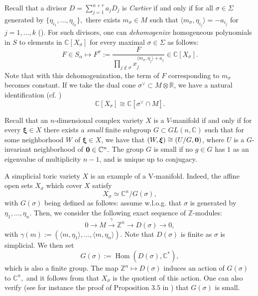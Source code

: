\documentclass[a4paper,11pt]{amsart}
\newcommand{\Hom}{\operatorname{Hom}}
\newcommand{\C}{\mathbb{C}}
\newcommand{\R}{\mathbb{R}}
\newcommand{\Z}{\mathbb{Z}}
\newcommand{\bfxi}{{\boldsymbol{\xi}}}
\numberwithin{thm}{section}
\numberwithin{equation}{section}
\theoremstyle{definition}
\theoremstyle{plain}
\begin{document}
Recall that a divisor $D=\sum_{j=1}^{n+r} a_j D_j$ is {\em Cartier} if and only if for all $\sigma\in\Sigma$ generated by $\{\eta_{i_1},\ldots, \eta_{i_k}\},$ there exists $m_\sigma\in M$ such that $\langle m_\sigma,\eta_{i_j}\rangle=-a_{i_j}$ for $j=1,\ldots, k$  (\cite[Theorem 4.2.8]{CLS11}). For such divisors, one can \textit{dehomogenize} homogeneous polynomials in $S$ to elements in  $\C[X_\sigma]$ for every maximal $\sigma\in\Sigma$ as follows:
\begin{equation}\label{deho}
F\in S_\alpha\mapsto F^\sigma:=\frac{F}{\prod_{j \notin \sigma} x_j^{\langle m_\sigma,\eta_j\rangle+a_j}}\in\C[X_\sigma].
\end{equation}
Note that with this dehomogenization, the term of $F$ corresponding to $m_\sigma$ becomes constant.
If we take the dual cone $\sigma^{\vee}\subset M\otimes\R$,  we have a natural identification (cf. \cite[Lemma 2.2]{cox95})
\begin{equation}\label{csigma}
\C[X_\sigma]\cong\C[\sigma^\vee\cap M].
\end{equation}

Recall that an $n$-dimensional complex variety $X$ is a $V$-manifold if and only if for every $\bfxi\in X$ there exists a {\em small} finite subgroup $G\subset GL(n,\C)$ such that for some neighborhood 
$W$ of $\bfxi\in X$, we have  that  $(W, \bfxi)\cong(U/G, {\bf0})$, where $U$ is a $G$-invariant neighborhood of ${\bf0}\in\C^n.$ The group $G$ is small if no $g\in G$ has $1$ as an eigenvalue of multiplicity $n-1$, and is unique up to conjugacy. 


A simplicial toric variety $X$ is an example of a V-manifold. Indeed, the affine open sets $X_\sigma$ which cover $X$  satisfy 
\begin{equation}\label{coc}
X_\sigma\simeq\C^n/G(\sigma),
\end{equation} 
 with $G(\sigma)$ being  defined as follows: assume w.l.o.g. that $\sigma$ is generated by $\eta_1,\ldots, \eta_n.$ Then, we consider the following exact sequence of $\Z$-modules:
\begin{equation}\label{xxx}
0\to M\stackrel{\gamma}{\to}\Z^n\to D(\sigma)\to0,
\end{equation}
with $\gamma(m):=(\langle m,\eta_1\rangle,\ldots, \langle m,\eta_n\rangle).$ Note that $D(\sigma)$ is finite as $\sigma$ is simplicial. We then set 
\begin{equation}\label{gsigma}
G(\sigma):=\Hom(D(\sigma),\C^*),
\end{equation}
which  is also a finite group.  The map $\Z^n\mapsto D(\sigma)$ induces an action of $G(\sigma)$ to $\C^n,$ and it follows from \cite{cox95} that $X_\sigma$ is the quotient of this action. One can also verify (see for instance the proof of Proposition $3.5$ in \cite{BC94}) that $G(\sigma)$ is small.
\end{document}
